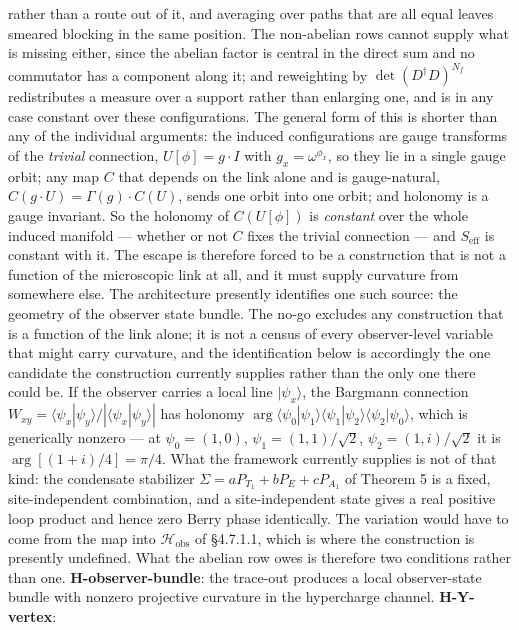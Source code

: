 \documentclass[
]{article}
\begin{document}
rather than a route out of it, and averaging over paths that are all
equal leaves smeared blocking in the same position. The non-abelian rows
cannot supply what is missing either, since the abelian factor is
central in the direct sum and no commutator has a component along it;
and reweighting by \(\det(D^\dagger D)^{N_f}\) redistributes a measure
over a support rather than enlarging one, and is in any case constant
over these configurations. The general form of this is shorter than any
of the individual arguments: the induced configurations are gauge
transforms of the \emph{trivial} connection, \(U[\phi] = g\cdot I\) with
\(g_x = \omega^{\phi_x}\), so they lie in a single gauge orbit; any map
\(C\) that depends on the link alone and is gauge-natural,
\(C(g\cdot U) = \Gamma(g)\cdot C(U)\), sends one orbit into one orbit;
and holonomy is a gauge invariant. So the holonomy of \(C(U[\phi])\) is
\emph{constant} over the whole induced manifold --- whether or not \(C\)
fixes the trivial connection --- and \(S_{\text{eff}}\) is constant with
it. The escape is therefore forced to be a construction that is not a
function of the microscopic link at all, and it must supply curvature
from somewhere else. The architecture presently identifies one such
source: the geometry of the observer state bundle. The no-go excludes
any construction that is a function of the link alone; it is not a
census of every observer-level variable that might carry curvature, and
the identification below is accordingly the one candidate the
construction currently supplies rather than the only one there could be.
If the observer carries a local line \(|\psi_x\rangle\), the Bargmann
connection
\(W_{xy} = \langle\psi_x|\psi_y\rangle/|\langle\psi_x|\psi_y\rangle|\)
has holonomy
\(\arg\langle\psi_0|\psi_1\rangle\langle\psi_1|\psi_2\rangle\langle\psi_2|\psi_0\rangle\),
which is generically nonzero --- at \(\psi_0 = (1,0)\),
\(\psi_1 = (1,1)/\sqrt2\), \(\psi_2 = (1,i)/\sqrt2\) it is
\(\arg[(1+i)/4] = \pi/4\). What the framework currently supplies is not
of that kind: the condensate stabilizer
\(\Sigma = aP_{T_1} + bP_E + cP_{A_1}\) of Theorem 5 is a fixed,
site-independent combination, and a site-independent state gives a real
positive loop product and hence zero Berry phase identically. The
variation would have to come from the map into
\(\mathcal{H}_{\text{obs}}\) of §4.7.1.1, which is where the
construction is presently undefined. What the abelian row owes is
therefore two conditions rather than one. \textbf{H-observer-bundle}:
the trace-out produces a local observer-state bundle with nonzero
projective curvature in the hypercharge channel. \textbf{H-Y-vertex}:
\end{document}
